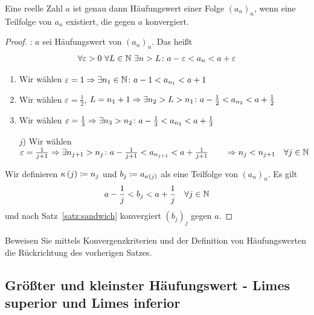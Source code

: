\begin{satz}
    \label{satz:haeufungswert-teilfolge}
    Eine reelle Zahl $a$ ist genau dann Häufungswert einer Folge $(a_n)_n$, wenn eine Teilfolge von $a_n$ existiert, die gegen $a$ konvergiert.

    \begin{proof}
        \anf{$\impl$}: $a$ sei Häufungswert von $(a_n)_n$. Das heißt
        \begin{align*}
            \forall \varepsilon > 0~\forall L\in\mathbb{N}~\exists n>L\colon a-\varepsilon < a_n < a+\varepsilon
        \end{align*}
        \begin{enumerate}[label=\arabic*)]
            \item Wir wählen $\varepsilon = 1 \Rightarrow{} \exists n_1\in\mathbb{N}\colon a-1 < a_{n_1} < a+1$
            \item Wir wählen $\varepsilon = \frac{1}{2}$, $L=n_1 + 1 \Rightarrow{} \exists n_2 > L > n_1\colon a-\frac{1}{2} < a_{n_2} < a + \frac{1}{2}$
            \item Wir wählen $\varepsilon = \frac{1}{3} \Rightarrow{} \exists n_3 > n_2\colon a - \frac{1}{3} < a_{n_3} < a + \frac{1}{3}$
            \item[$j$)] Wir wählen $\varepsilon = \frac{1}{j+1} \Rightarrow{} \exists n_{j+1} > n_j\colon a-\frac{1}{j+1} < a_{n_{j+1}} < a + \frac{1}{j+1}\qquad \Rightarrow{} n_j < n_{j+1}\quad\forall j \in \mathbb{N}$
        \end{enumerate}
        \noindent Wir definieren $\kappa\left(j\right) \coloneqq n_j$ und $b_j \coloneqq a_{\kappa(j)}$ als eine Teilfolge von $(a_n)_n$. Es gilt
        \begin{align*}
            a-\frac{1}{j} < b_j < a + \frac{1}{j}\quad\forall j\in\mathbb{N}
        \end{align*}
        und nach Satz~\ref{satz:sandwich} konvergiert $(b_j)_j$ gegen $a$.\qedhere
    \end{proof}
    \begin{uebung}
        Beweisen Sie mittels Konvergenzkriterien und der Definition von Häufungswerten die Rückrichtung des vorherigen Satzes.
    \end{uebung}
\end{satz}

\newpage


\subsection{Größter und kleinster Häufungswert - Limes superior und Limes inferior}
\marginnote{[28. Nov]}


